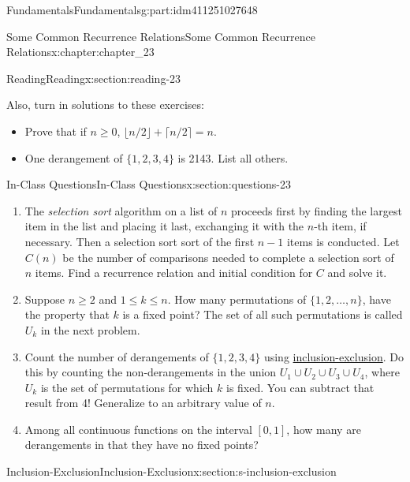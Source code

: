 \documentclass[oneside,10pt,]{book}
\numberwithin{equation}{section}
\begin{document}
\begin{partptx}{Fundamentals}{}{Fundamentals}{}{}{g:part:idm411251027648}
\begin{chapterptx}{Some Common Recurrence Relations}{}{Some Common Recurrence Relations}{}{}{x:chapter:chapter_23}
\begin{sectionptx}{Reading}{}{Reading}{}{}{x:section:reading-23}
\par
Also, turn in solutions to these exercises:%
\begin{itemize}[label=\textbullet]
\item{}Prove that if \(n \geq 0\), \(\lfloor n/2\rfloor +\lceil n/2\rceil = n\).%
\item{}One derangement of \(\{1,2,3,4\}\) is 2143.  List all others.%
\end{itemize}
%
\end{sectionptx}
%
%
\typeout{************************************************}
\typeout{************************************************}
%
\begin{sectionptx}{In-Class Questions}{}{In-Class Questions}{}{}{x:section:questions-23}
%
\begin{enumerate}[label=\arabic*.]
\item{}The \emph{selection sort} algorithm on a list of \(n\) proceeds first by finding the largest item in the list and placing it last, exchanging it with the \(n\)-th item, if necessary.  Then a selection sort sort of the first \(n-1\) items is conducted. Let \(C(n)\) be the number of comparisons needed to complete a selection sort of \(n\) items.   Find a recurrence relation and initial condition for \(C\) and solve it.%
\item{}Suppose \(n \geq 2\) and \(1 \leq k \leq n\).  How many permutations of \(\{1,2, \dots ,n\}\),  have the property that \(k\) is a fixed point?  The set of all such permutations is called \(U_k\) in the next problem.%
\item\hypertarget{x:li:p3}{}Count the number of derangements of \(\{1,2,3,4\}\) using \hyperref[x:section:s-inclusion-exclusion]{inclusion-exclusion}. Do this by counting the non-derangements in the union \(U_1 \cup U_2 \cup U_3 \cup U_4\), where \(U_k\) is the set of permutations for which \(k\) is fixed. You can subtract that result from 4!   Generalize to an arbitrary value of \(n\).%
\item{}Among all continuous functions on the interval \([0,1]\), how many are derangements in that they have no fixed points?%
\end{enumerate}
%
\end{sectionptx}
%
%
\typeout{************************************************}
\typeout{************************************************}
%
\begin{sectionptx}{Inclusion-Exclusion}{}{Inclusion-Exclusion}{}{}{x:section:s-inclusion-exclusion}

\end{sectionptx}
\end{chapterptx}
\end{partptx}
\end{document}
